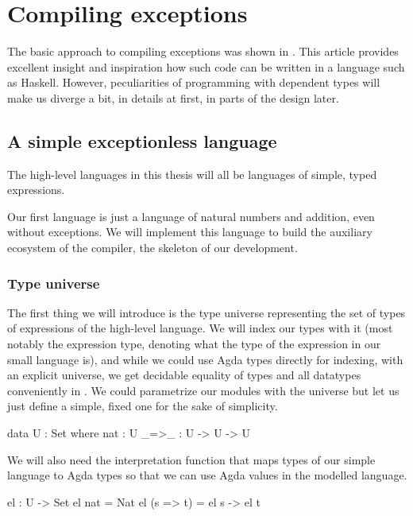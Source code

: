 \chapter{Compiling exceptions}

The basic approach to compiling exceptions was shown in \cite{gmh:exceptions}.
This article provides excellent insight and inspiration how such code can be written
in a language such as Haskell.
However, peculiarities of programming with dependent types will make us
diverge a bit, in details at first, in parts of the design later.

\section{A simple exceptionless language}

The high-level languages in this thesis will all be languages of simple, typed
expressions.

Our first language is just a language of natural numbers and addition, even
without exceptions. We will implement this language to build the auxiliary
ecosystem of the compiler, the skeleton of our development.

\subsection{Type universe}

The first thing we will introduce is the type universe representing the set of
types of expressions of the high-level language. We will index our types with
it (most notably the expression type, denoting what the type of the expression
in our small language is), and while we could use Agda types directly for
indexing, with an explicit universe, we get decidable equality of types and all
datatypes conveniently in . We could parametrize our modules with
the universe but let us just define a simple, fixed one for the sake of
simplicity.

\begin{code}
  data U : Set where
    nat : U
    _=>_ : U -> U -> U
\end{code}

\noindent We will also need the interpretation function that maps types of our
simple language to Agda types so that we can use Agda values in the modelled
language.

\begin{code}
  el : U -> Set
  el nat = Nat
  el (s => t) = el s -> el t
\end{code}

